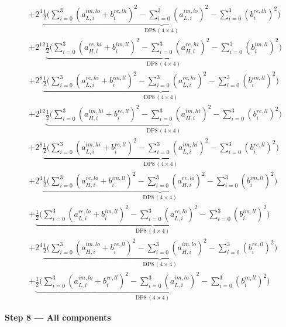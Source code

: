 \documentclass[fleqn]{article}
\newcommand{\DPop}[3]{\mathrm{DP#1}\,(#2\!\times\!#3)}
\begin{document}
\begin{align*}
  & + 2^{4}\underbrace{\tfrac{1}{2}\Big(\sum_{i=0}^{3}(a_{L,i}^{im,lo}{+}b_i^{re,lh})^2 - \sum_{i=0}^{3}(a_{L,i}^{im,lo})^2 - \sum_{i=0}^{3}(b_i^{re,lh})^2\Big)}_{\DPop{8}{4}{4}} \\[0.5em]
  & + 2^{12}\underbrace{\tfrac{1}{2}\Big(\sum_{i=0}^{3}(a_{H,i}^{re,hi}{+}b_i^{im,ll})^2 - \sum_{i=0}^{3}(a_{H,i}^{re,hi})^2 - \sum_{i=0}^{3}(b_i^{im,ll})^2\Big)}_{\DPop{8}{4}{4}} \\[0.5em]
  & + 2^{8}\underbrace{\tfrac{1}{2}\Big(\sum_{i=0}^{3}(a_{L,i}^{re,hi}{+}b_i^{im,ll})^2 - \sum_{i=0}^{3}(a_{L,i}^{re,hi})^2 - \sum_{i=0}^{3}(b_i^{im,ll})^2\Big)}_{\DPop{8}{4}{4}} \\[0.5em]
  & + 2^{12}\underbrace{\tfrac{1}{2}\Big(\sum_{i=0}^{3}(a_{H,i}^{im,hi}{+}b_i^{re,ll})^2 - \sum_{i=0}^{3}(a_{H,i}^{im,hi})^2 - \sum_{i=0}^{3}(b_i^{re,ll})^2\Big)}_{\DPop{8}{4}{4}} \\[0.5em]
  & + 2^{8}\underbrace{\tfrac{1}{2}\Big(\sum_{i=0}^{3}(a_{L,i}^{im,hi}{+}b_i^{re,ll})^2 - \sum_{i=0}^{3}(a_{L,i}^{im,hi})^2 - \sum_{i=0}^{3}(b_i^{re,ll})^2\Big)}_{\DPop{8}{4}{4}} \\[0.5em]
  & + 2^{4}\underbrace{\tfrac{1}{2}\Big(\sum_{i=0}^{3}(a_{H,i}^{re,lo}{+}b_i^{im,ll})^2 - \sum_{i=0}^{3}(a_{H,i}^{re,lo})^2 - \sum_{i=0}^{3}(b_i^{im,ll})^2\Big)}_{\DPop{8}{4}{4}} \\[0.5em]
  & + \underbrace{\tfrac{1}{2}\Big(\sum_{i=0}^{3}(a_{L,i}^{re,lo}{+}b_i^{im,ll})^2 - \sum_{i=0}^{3}(a_{L,i}^{re,lo})^2 - \sum_{i=0}^{3}(b_i^{im,ll})^2\Big)}_{\DPop{8}{4}{4}} \\[0.5em]
  & + 2^{4}\underbrace{\tfrac{1}{2}\Big(\sum_{i=0}^{3}(a_{H,i}^{im,lo}{+}b_i^{re,ll})^2 - \sum_{i=0}^{3}(a_{H,i}^{im,lo})^2 - \sum_{i=0}^{3}(b_i^{re,ll})^2\Big)}_{\DPop{8}{4}{4}} \\[0.5em]
  & + \underbrace{\tfrac{1}{2}\Big(\sum_{i=0}^{3}(a_{L,i}^{im,lo}{+}b_i^{re,ll})^2 - \sum_{i=0}^{3}(a_{L,i}^{im,lo})^2 - \sum_{i=0}^{3}(b_i^{re,ll})^2\Big)}_{\DPop{8}{4}{4}}
\end{align*}

\textbf{Step 8 --- All components}
\end{document}
